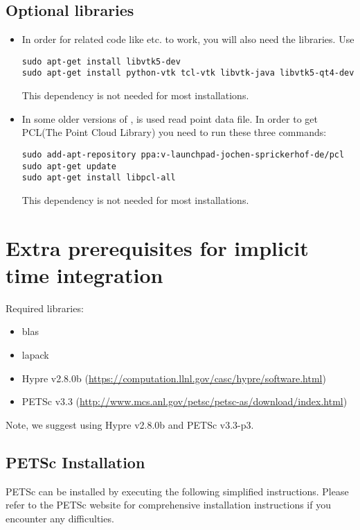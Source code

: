 \documentclass[11pt,fleqn]{book} %
\begin{document}
\subsection{Optional libraries}
\begin{itemize}
  \item In order for related code like  etc. to work, you will also need the 
         libraries. Use
\begin{lstlisting}[backgroundcolor=\color{background}]
sudo apt-get install libvtk5-dev
sudo apt-get install python-vtk tcl-vtk libvtk-java libvtk5-qt4-dev
\end{lstlisting}
        \begin{NoteBox}
        This dependency is not needed for most installations.
        \end{NoteBox}

  \item In some older versions of \Vaango,  is used read point data file. In order 
        to get PCL(The Point Cloud Library) you need to run these three commands:
\begin{lstlisting}[backgroundcolor=\color{background}]
sudo add-apt-repository ppa:v-launchpad-jochen-sprickerhof-de/pcl
sudo apt-get update
sudo apt-get install libpcl-all
\end{lstlisting}
        \begin{NoteBox}
        This dependency is not needed for most installations.
        \end{NoteBox}
\end{itemize}

\section{Extra prerequisites for implicit  time integration}
Required libraries:
\begin{itemize}
\item blas
\item lapack
\item Hypre v2.8.0b (\url{https://computation.llnl.gov/casc/hypre/software.html})
\item PETSc v3.3 (\url{http://www.mcs.anl.gov/petsc/petsc-as/download/index.html})
\end{itemize}
Note, we suggest using Hypre v2.8.0b and PETSc v3.3-p3. 

\subsection{PETSc Installation}
PETSc can be installed by executing the following simplified
instructions.  Please refer to the PETSc website for comprehensive
installation instructions if you encounter any difficulties.
\end{document}
